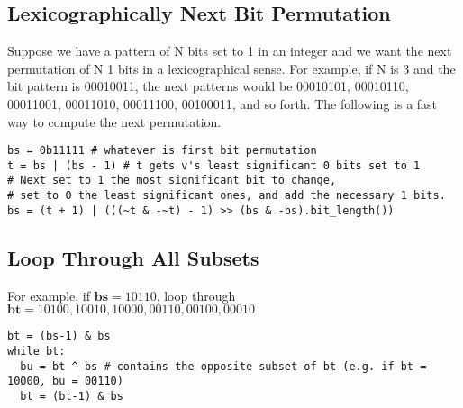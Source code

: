 \documentclass[letterpaper]{article}
\begin{document}
\subsection{Lexicographically Next Bit Permutation}
Suppose we have a pattern of N bits set to 1 in an integer and we want the next permutation of N 1 bits in a lexicographical sense. For example, if N is 3 and the bit pattern is 00010011, the next patterns would be 00010101, 00010110, 00011001, 00011010, 00011100, 00100011, and so forth. The following is a fast way to compute the next permutation.

\begin{lstlisting}
bs = 0b11111 # whatever is first bit permutation
t = bs | (bs - 1) # t gets v's least significant 0 bits set to 1
# Next set to 1 the most significant bit to change,
# set to 0 the least significant ones, and add the necessary 1 bits.
bs = (t + 1) | (((~t & -~t) - 1) >> (bs & -bs).bit_length())
\end{lstlisting}

\subsection{Loop Through All Subsets}
For example, if $\mathbf{bs} = 10110$, loop through $\mathbf{bt} = 10100, 10010, 10000, 00110, 00100, 00010$

\begin{lstlisting}
bt = (bs-1) & bs
while bt:
  bu = bt ^ bs # contains the opposite subset of bt (e.g. if bt = 10000, bu = 00110)
  bt = (bt-1) & bs
\end{lstlisting}



\end{document}
